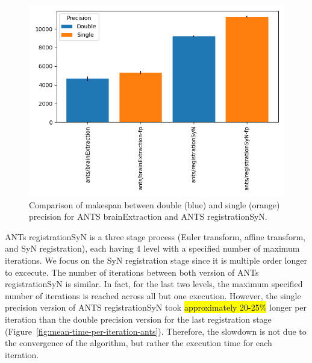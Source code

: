 \documentclass[conference]{IEEEtran}
\newcommand{\HL}[1]{\hl{#1}}
\begin{document}
\begin{figure}[ht]
	\includegraphics[width=\linewidth]{figures/makespan-ants.png}
	\caption{Comparison of makespan between double (blue) and single (orange) precision for ANTS brainExtraction and ANTS registrationSyN.}
	\label{fig:makespan-ants}
\end{figure}

ANTs registrationSyN is a three stage process (Euler transform, affine transform, and SyN registration), each having 4 level with a specified number of maximum iterations. We focus on the SyN registration stage since it is multiple order longer to excecute. The number of iterations between both version of ANTs registrationSyN is similar. In fact, for the last two levels, the maximum specified number of iterations is reached across all but one execution. However, the single precision version of ANTS registrationSyN took \HL{approximately 20-25\%} longer per iteration than the double precision version for the last registration stage (Figure~\ref{fig:mean-time-per-iteration-ants}). Therefore, the slowdown is not due to the convergence of the algorithm, but rather the execution time for each iteration.
\end{document}
